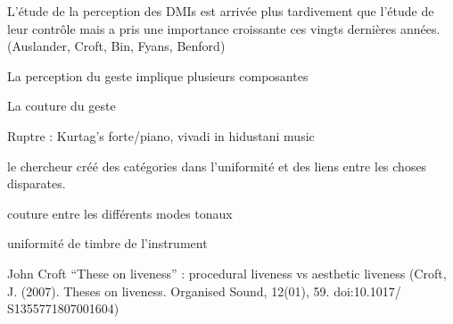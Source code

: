 L'étude de la perception des \glspl{DMI} est arrivée plus tardivement que l'étude de leur contrôle mais a pris une importance croissante ces vingts dernières années. (Auslander, Croft, Bin, Fyans, Benford)


La perception du geste implique plusieurs composantes 

La couture du geste

Ruptre : Kurtag's forte/piano, vivadi in hidustani music

le chercheur créé des catégories dans l'uniformité et des liens entre les choses disparates.

couture entre les différents modes tonaux

uniformité de timbre de l'instrument

John Croft ``These on liveness''  : procedural liveness vs aesthetic liveness (Croft, J. (2007). Theses on liveness. Organised Sound, 12(01), 59. doi:10.1017/
S1355771807001604)
